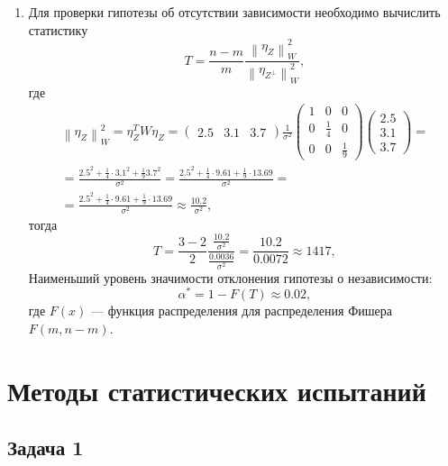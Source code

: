 \documentclass[a4paper,12pt]{article}
\newcommand{\norm}[1]{\left \| #1 \right \|}
\newcommand{\pr}[2]{#1_{#2}}
\newcommand{\pro}[2]{#1_{#2^\perp}}
\begin{document}
\begin{enumerate}
    \item Для проверки гипотезы об отсутствии зависимости необходимо вычислить статистику
          \[
              T = \frac{n-m}{m} \frac{\norm{\pr{\eta}{Z}}_W^2}{\norm{\pro{\eta}{Z}}_W^2} ,
          \]
          где
          \begin{multline*}
              \norm{\pr{\eta}{Z}}_W^2
              = \pr{\eta}{Z}^T W \pr{\eta}{Z}
              = \begin{pmatrix}
                  2.5 & 3.1 & 3.7
              \end{pmatrix}
              \frac{1}{\sigma^2}
              \begin{pmatrix}
                  1 & 0           & 0           \\
                  0 & \frac{1}{4} & 0           \\
                  0 & 0           & \frac{1}{9}
              \end{pmatrix}
              \begin{pmatrix}
                  2.5 \\
                  3.1 \\
                  3.7
              \end{pmatrix} = \\
              = \frac{2.5^2 + \frac{1}{4} \cdot 3.1^2 + \frac{1}{9} 3.7^2}{\sigma^2}
              = \frac{2.5^2 + \frac{1}{4} \cdot 9.61 + \frac{1}{9} \cdot 13.69}{\sigma^2} = \\
              = \frac{2.5^2 + \frac{1}{4} \cdot 9.61 + \frac{1}{9} \cdot 13.69}{\sigma^2}
              \approx \frac{10.2}{\sigma^2} ,
          \end{multline*}
          тогда
          \[
              T
              = \frac{3-2}{2} \frac{\frac{10.2}{\sigma^2}}{\frac{0.0036}{\sigma^2}}
              = \frac{10.2}{0.0072}
              \approx 1417,
          \]
          Наименьший уровень значимости отклонения гипотезы о независимости:
          \[
              \alpha^*
              = 1 - F(T)
              \approx 0.02 ,
          \]
          где $F(x)$ --- функция распределения для распределения Фишера $F(m,n-m)$.
\end{enumerate}

\section*{Методы статистических испытаний}

\subsection*{Задача 1}
\end{document}
